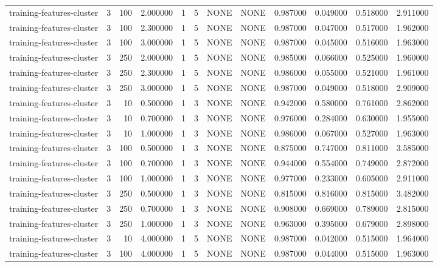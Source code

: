 \begin{tabular}{lrrrllllrrrr}
training-features-cluster & 3 & 100 & 2.000000 & 1 & 5 & NONE & NONE & 0.987000 & 0.049000 & 0.518000 & 2.911000 \\
training-features-cluster & 3 & 100 & 2.300000 & 1 & 5 & NONE & NONE & 0.987000 & 0.047000 & 0.517000 & 1.962000 \\
training-features-cluster & 3 & 100 & 3.000000 & 1 & 5 & NONE & NONE & 0.987000 & 0.045000 & 0.516000 & 1.963000 \\
training-features-cluster & 3 & 250 & 2.000000 & 1 & 5 & NONE & NONE & 0.985000 & 0.066000 & 0.525000 & 1.960000 \\
training-features-cluster & 3 & 250 & 2.300000 & 1 & 5 & NONE & NONE & 0.986000 & 0.055000 & 0.521000 & 1.961000 \\
training-features-cluster & 3 & 250 & 3.000000 & 1 & 5 & NONE & NONE & 0.987000 & 0.049000 & 0.518000 & 2.909000 \\
training-features-cluster & 3 & 10 & 0.500000 & 1 & 3 & NONE & NONE & 0.942000 & 0.580000 & 0.761000 & 2.862000 \\
training-features-cluster & 3 & 10 & 0.700000 & 1 & 3 & NONE & NONE & 0.976000 & 0.284000 & 0.630000 & 1.955000 \\
training-features-cluster & 3 & 10 & 1.000000 & 1 & 3 & NONE & NONE & 0.986000 & 0.067000 & 0.527000 & 1.963000 \\
training-features-cluster & 3 & 100 & 0.500000 & 1 & 3 & NONE & NONE & 0.875000 & 0.747000 & 0.811000 & 3.585000 \\
training-features-cluster & 3 & 100 & 0.700000 & 1 & 3 & NONE & NONE & 0.944000 & 0.554000 & 0.749000 & 2.872000 \\
training-features-cluster & 3 & 100 & 1.000000 & 1 & 3 & NONE & NONE & 0.977000 & 0.233000 & 0.605000 & 2.911000 \\
training-features-cluster & 3 & 250 & 0.500000 & 1 & 3 & NONE & NONE & 0.815000 & 0.816000 & 0.815000 & 3.482000 \\
training-features-cluster & 3 & 250 & 0.700000 & 1 & 3 & NONE & NONE & 0.908000 & 0.669000 & 0.789000 & 2.815000 \\
training-features-cluster & 3 & 250 & 1.000000 & 1 & 3 & NONE & NONE & 0.963000 & 0.395000 & 0.679000 & 2.898000 \\
training-features-cluster & 3 & 10 & 4.000000 & 1 & 5 & NONE & NONE & 0.987000 & 0.042000 & 0.515000 & 1.964000 \\
training-features-cluster & 3 & 100 & 4.000000 & 1 & 5 & NONE & NONE & 0.987000 & 0.044000 & 0.515000 & 1.963000 \\

\end{tabular}
